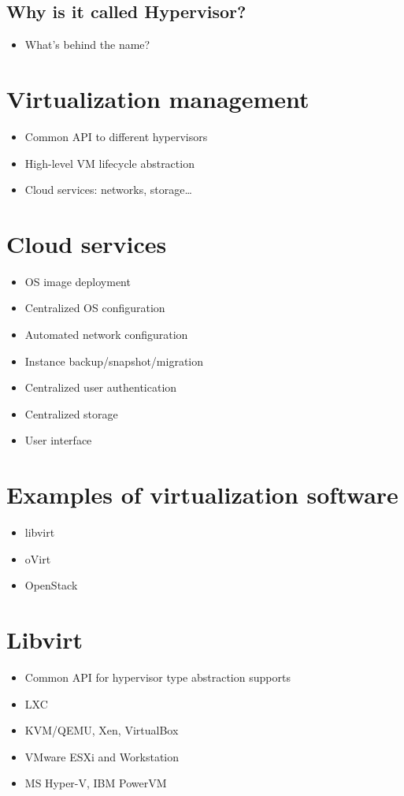 \documentclass[11pt]{article}
\begin{document}
\subsection*{Why is it called Hypervisor?}
\label{sec:orge60ff7c}
\begin{itemize}
\item What's behind the name?
\end{itemize}

\section*{Virtualization management}
\label{sec:org2238c25}
\begin{itemize}
\item Common API to different hypervisors
\item High-level VM lifecycle abstraction
\item Cloud services: networks, storage\ldots{}
\end{itemize}

\section*{Cloud services}
\label{sec:org2ab7f4d}
\begin{itemize}
\item OS image deployment
\item Centralized OS configuration
\item Automated network configuration
\item Instance backup/snapshot/migration
\item Centralized user authentication
\item Centralized storage
\item User interface
\end{itemize}

\section*{Examples of virtualization software}
\label{sec:org004a08c}
\begin{itemize}
\item libvirt
\item oVirt
\item OpenStack
\end{itemize}

\section*{Libvirt}
\label{sec:orga9fe6a8}
\begin{itemize}
\item Common API for hypervisor type abstraction supports
\item LXC
\item KVM/QEMU, Xen, VirtualBox
\item VMware ESXi and Workstation
\item MS Hyper-V, IBM PowerVM
\end{itemize}
\end{document}
